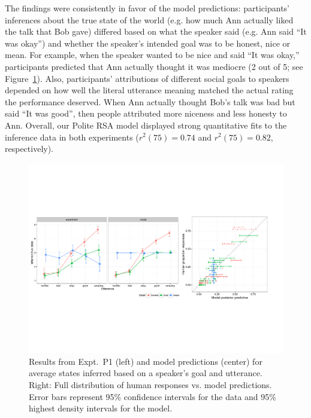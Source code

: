 The findings were consistently in favor of the model predictions: participants' inferences about the true state of the world (e.g. how much Ann actually liked the talk that Bob gave) differed based on what the speaker said (e.g. Ann said ``It was okay'') and whether the speaker's intended goal was to be honest, nice or mean. For example, when the speaker wanted to be nice and said ``It was okay,'' participants predicted that Ann actually thought it was mediocre (2 out of 5; see Figure~\ref{fig:expt2}). Also, participants' attributions of different social goals to speakers depended on how well the literal utterance meaning matched the actual rating the performance deserved. When Ann actually thought Bob's talk was bad but said ``It was good'', then people attributed more niceness and less honesty to Ann. Overall, our Polite RSA model displayed strong quantitative fits to the inference data in both experiments ($r^2(75) = 0.74$ and $r^2(75) = 0.82$, respectively).

\begin{figure}[h]
\begin{centering}
\includegraphics[width=\textwidth]{figures/exp2.pdf}
\caption{\label{fig:expt2} Results from Expt.~P1 (left) and model predictions (center) for average states inferred based on a speaker's goal and utterance. Right: Full distribution of human responses vs. model predictions. Error bars represent 95\% confidence intervals for the data and 95\% highest density intervals for the model.}
\end{centering}
\end{figure}

